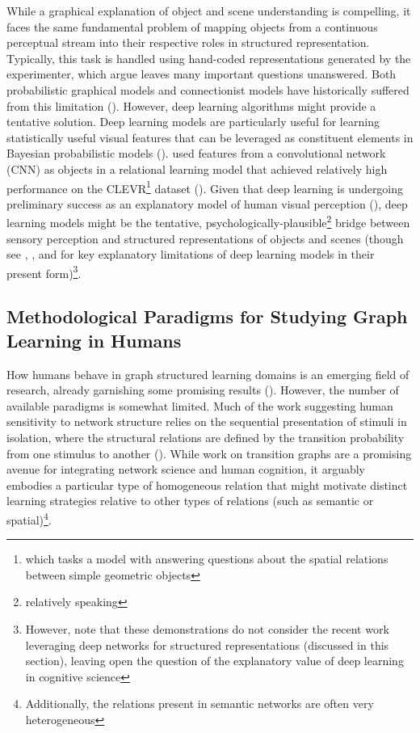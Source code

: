 \documentclass[12pt]{article}
\let\oldcite=\cite
\let\oldtextcite=\textcite
\renewcommand{\cite}[1]{\textcolor[rgb]{0, .121, .388}{\oldcite{#1}}}
\renewcommand{\textcite}[1]{\textcolor[rgb]{0, .121, .388}{\oldtextcite{#1}}}
\begin{document}
While a graphical explanation of object and scene understanding is compelling, it faces the same fundamental problem of mapping objects from a continuous perceptual stream into their respective roles in structured representation. Typically, this task is handled using hand-coded representations generated by the experimenter, which \textcite{chalmers1992high} argue leaves many important questions unanswered. Both probabilistic graphical models and connectionist models have historically suffered from this limitation (\cite{torralba2011learning,hinton1981shape,hummel2004solution}). However, deep learning algorithms might provide a tentative solution. Deep learning models are particularly useful for learning statistically useful visual features that can be leveraged as constituent elements in Bayesian probabilistic models (\cite{torralba2011learning,johnson2016composing}). \textcite{santoro2017simple} used features from a convolutional network (CNN) as objects in a relational learning model that achieved relatively high performance on the CLEVR\footnote{which tasks a model with answering questions about the spatial relations between simple geometric objects} dataset (\cite{johnson2017clevr}). Given that deep learning is undergoing preliminary success as an explanatory model of human visual perception (\cite{peterson2016adapting,long2018mid,khaligh2014deep}), deep learning models might be the tentative, psychologically-plausible\footnote{relatively speaking} bridge between sensory perception and structured representations of objects and scenes (though see \cite{baker2018deep}, \cite{baker2018illusory}, and \cite{erdogan20163d} for key explanatory limitations of deep learning models in their present form)\footnote{However, note that these demonstrations do not consider the recent work leveraging deep networks for structured representations (discussed in this section), leaving open the question of the explanatory value of deep learning in cognitive science}.


\subsection{Methodological Paradigms for Studying Graph Learning in Humans}

How humans behave in graph structured learning domains is an emerging field of research, already garnishing some promising results (\cite{lynn2019graph,kahn2018network,karuza2017process,wu2020inference}). However, the number of available paradigms is somewhat limited. Much of the work suggesting human sensitivity to network structure relies on the sequential presentation of stimuli in isolation, where the structural relations are defined by the transition probability from one stimulus to another (\cite{kahn2018network,karuza2017process,zurn2020network}). While work on transition graphs are a promising avenue for integrating network science and human cognition, it arguably embodies a particular type of homogeneous relation that might motivate distinct learning strategies relative to other types of relations (such as semantic or spatial)\footnote{Additionally, the relations present in semantic networks are often very heterogeneous}. 
\end{document}
